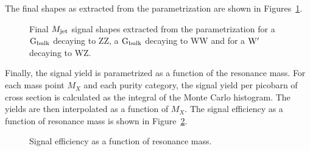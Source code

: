 The final \MJO shapes as extracted from the parametrization are shown in Figures~\ref{fig:MJfromjson}.
\begin{figure}[htpb]
\centering
{}
\caption{Final $M_{\rm jet}$ signal shapes extracted from the parametrization for a $\mathrm{G}_\mathrm{bulk}$ decaying to ZZ, a $\mathrm{G}_\mathrm{bulk}$ decaying to WW and for a $\mathrm{W}^\prime$ decaying to WZ.}
\label{fig:MJfromjson}
\end{figure}
Finally, the signal yield is parametrized as a function of the resonance mass. For each mass point $M_X$ and each purity category, the signal yield per picobarn of cross section is calculated as the integral of the Monte Carlo histogram.
The yields are then interpolated as a function of $M_X$. The signal efficiency as a function of resonance mass is shown in Figure~\ref{fig:SignalYields}.
\begin{figure}[h!]
\centering
{}
\caption{Signal efficiency as a function of resonance mass.}
\label{fig:SignalYields}
\end{figure}



